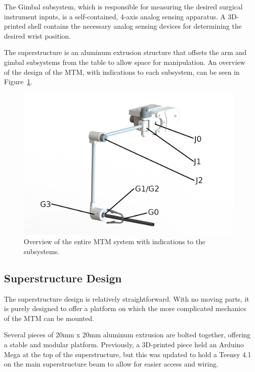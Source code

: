 The Gimbal subsystem, which is responsible for measuring the desired surgical instrument inputs, is a self-contained, 4-axis analog sensing apparatus. A 3D-printed shell contains the necessary analog sensing devices for determining the desired wrist position.

The superstructure is an aluminum extrusion structure that offsets the arm and gimbal subsystems from the table to allow space for manipulation. An overview of the design of the MTM, with indications to each subsystem, can be seen in Figure~\ref{fig:mtm_overview}.

\begin{figure}[H] %
    \centering
    \includegraphics[width=1.0\linewidth]{figures/ArmOverview.png}
    \caption{Overview of the entire MTM system with indications to the subsystems.}
    \label{fig:mtm_overview}
\end{figure}

\subsection{Superstructure Design}

The superstructure design is relatively straightforward. With no moving parts, it is purely designed to offer a platform on which the more complicated mechanics of the MTM can be mounted.

Several pieces of 20mm x 20mm aluminum extrusion are bolted together, offering a stable and modular platform. Previously, a 3D-printed piece held an Arduino Mega at the top of the superstructure, but this was updated to hold a Teensy 4.1 on the main superstructure beam to allow for easier access and wiring. 

